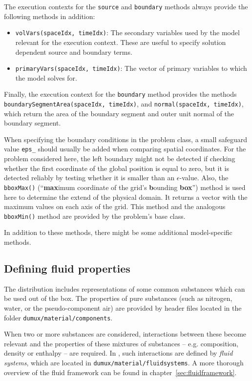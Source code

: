 The execution contexts for the \texttt{source} and \texttt{boundary}
methods always provide the following methods in addition:
\begin{itemize}
\item \texttt{volVars(spaceIdx, timeIdx)}: The secondary variables
  used by the model relevant for the execution context. These are
  useful to specify solution dependent source and boundary terms.
\item \texttt{primaryVars(spaceIdx, timeIdx)}: The vector of primary
  variables to which the model solves for.
\end{itemize}

Finally, the execution context for the \texttt{boundary} method
provides the methods \texttt{boundarySegmentArea(spaceIdx, timeIdx)},
and \texttt{normal(spaceIdx, timeIdx)}, which return the area of the
boundary segment and outer unit normal of the boundary segment.

When specifying the boundary conditions in the problem class, a small
safeguard value \texttt{eps\_} should usually be added when comparing
spatial coordinates. For the problem considered here, the left
boundary might not be detected if checking whether the first
coordinate of the global position is equal to zero, but it is detected
reliably by testing whether it is smaller than an
$\epsilon$-value. Also, the \texttt{bboxMax()} (``\textbf{max}imum
coordinate of the grid's \textbf{b}ounding \textbf{box}'') method is
used here to determine the extend of the physical domain. It returns a
vector with the maximum values on each axis of the grid. This method
and the analogous \texttt{bboxMin()} method are provided by the
problem's base class.

In addition to these methods, there might be some additional
model-specific methods. 

\subsection{Defining fluid properties}
\label{tutorial-coupled:description-fluid-class}

The \eWoms distribution includes representations of some common
substances which can be used out of the box. The properties of pure
substances (such as nitrogen, water, or the pseudo-component air) are
provided by header files located in the folder
\texttt{dumux/material/components}.

When two or more substances are considered, interactions between these
become relevant and the properties of these mixtures of substances --
e.g. composition, density or enthalpy -- are required. In \eWoms, such
interactions are defined by {\em fluid systems}, which are located in
\texttt{dumux/material/fluidsystems}. A more thorough overview of the
\eWoms fluid framework can be found in
chapter~\ref{sec:fluidframework}.

